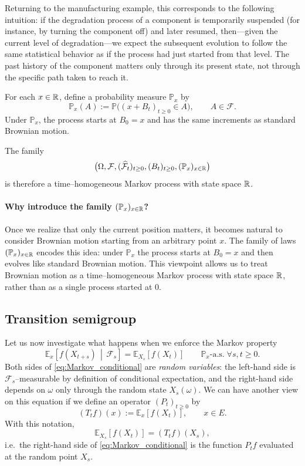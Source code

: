 Returning to the manufacturing example, this corresponds to the following intuition: if the degradation process of a component is temporarily suspended (for instance, by turning the component off) and later resumed, then—given the current level of degradation—we expect the subsequent evolution to follow the same statistical behavior as if the process had just started from that level. The past history of the component matters only through its present state, not through the specific path taken to reach it.

\medskip 

For each $x\in\mathbb{R}$, define a probability measure $\mathbb P_x$ by
\[
\mathbb P_x(A) := \mathbb P\bigl((x+B_t)_{t\ge0}\in A\bigr),
\qquad A\in\mathcal F.
\]
Under $\mathbb P_x$, the process starts at $B_0=x$ and has the same increments as standard Brownian
motion.

The family
\[
\bigl(\Omega,\mathcal F,(\widehat{\mathcal F}_t)_{t\ge0},(B_t)_{t\ge0},(\mathbb P_x)_{x\in\mathbb{R}}\bigr)
\]
is therefore a time--homogeneous Markov process with state space $\mathbb{R}$.

\paragraph{Why introduce the family $(\mathbb P_x)_{x\in\mathbb{R}}$?}
Once we realize that only the current position matters, it becomes natural to consider Brownian motion
starting from an arbitrary point $x$.
The family of laws $(\mathbb P_x)_{x\in\mathbb{R}}$ encodes this idea:
under $\mathbb P_x$ the process starts at $B_0=x$ and then evolves like standard Brownian motion.
This viewpoint allows us to treat Brownian motion as a time--homogeneous Markov process with state space $\mathbb{R}$,
rather than as a single process started at $0$.



\subsection{Transition semigroup}

Let us now investigate what happens when we enforce the Markov property
\begin{equation}\label{eq:Markov_conditional}
\mathbb{E}_x\!\left[f(X_{t+s}) \,\middle|\, \mathcal{F}_s\right]
=
\mathbb{E}_{X_s}\!\left[f(X_t)\right]
\qquad \mathbb{P}_x\text{-a.s.} \; \forall s,t\ge 0.
\end{equation}
Both sides of \eqref{eq:Markov_conditional} are \emph{random variables}:
the left-hand side is $\mathcal{F}_s$--measurable by definition of conditional expectation,
and the right-hand side depends on $\omega$ only through the random state $X_s(\omega)$. We can have another view on this equation if we define an operator $(P_t)_{t\ge 0}$ by
\[
(T_t f)(x) := \mathbb{E}_x\!\left[f(X_t)\right], \qquad x\in E.
\]
With this notation,
\[
\mathbb{E}_{X_s}\!\left[f(X_t)\right] = (T_t f)(X_s),
\]
i.e.\ the right-hand side of \eqref{eq:Markov_conditional} is the function $P_t f$
evaluated at the random point $X_s$.

